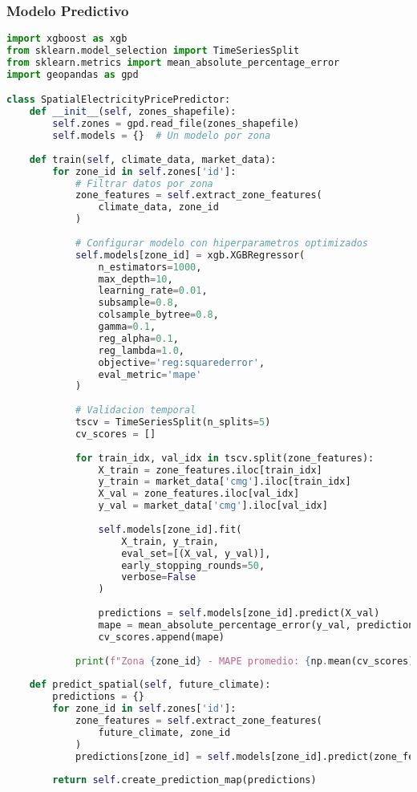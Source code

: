 \documentclass[12pt,a4paper]{article}
\begin{document}
\subsubsection{Modelo Predictivo}
\begin{lstlisting}[language=Python, caption=Implementación del modelo XGBoost]
import xgboost as xgb
from sklearn.model_selection import TimeSeriesSplit
from sklearn.metrics import mean_absolute_percentage_error
import geopandas as gpd

class SpatialElectricityPricePredictor:
    def __init__(self, zones_shapefile):
        self.zones = gpd.read_file(zones_shapefile)
        self.models = {}  # Un modelo por zona
        
    def train(self, climate_data, market_data):
        for zone_id in self.zones['id']:
            # Filtrar datos por zona
            zone_features = self.extract_zone_features(
                climate_data, zone_id
            )
            
            # Configurar modelo con hiperparametros optimizados
            self.models[zone_id] = xgb.XGBRegressor(
                n_estimators=1000,
                max_depth=10,
                learning_rate=0.01,
                subsample=0.8,
                colsample_bytree=0.8,
                gamma=0.1,
                reg_alpha=0.1,
                reg_lambda=1.0,
                objective='reg:squarederror',
                eval_metric='mape'
            )
            
            # Validacion temporal
            tscv = TimeSeriesSplit(n_splits=5)
            cv_scores = []
            
            for train_idx, val_idx in tscv.split(zone_features):
                X_train = zone_features.iloc[train_idx]
                y_train = market_data['cmg'].iloc[train_idx]
                X_val = zone_features.iloc[val_idx]
                y_val = market_data['cmg'].iloc[val_idx]
                
                self.models[zone_id].fit(
                    X_train, y_train,
                    eval_set=[(X_val, y_val)],
                    early_stopping_rounds=50,
                    verbose=False
                )
                
                predictions = self.models[zone_id].predict(X_val)
                mape = mean_absolute_percentage_error(y_val, predictions)
                cv_scores.append(mape)
            
            print(f"Zona {zone_id} - MAPE promedio: {np.mean(cv_scores):.2%}")
    
    def predict_spatial(self, future_climate):
        predictions = {}
        for zone_id in self.zones['id']:
            zone_features = self.extract_zone_features(
                future_climate, zone_id
            )
            predictions[zone_id] = self.models[zone_id].predict(zone_features)
        
        return self.create_prediction_map(predictions)
\end{lstlisting}
\end{document}
